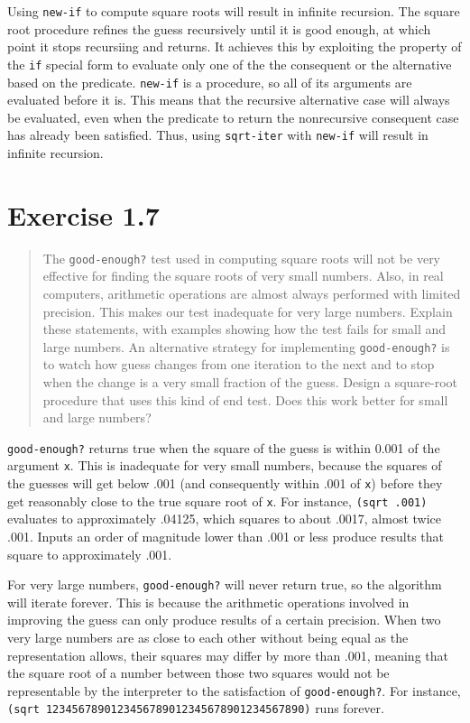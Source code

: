 \documentclass{article}
\begin{document}
Using \verb|new-if| to compute square roots will result in infinite
recursion. The square root procedure refines the guess recursively until it is
good enough, at which point it stops recursiing and returns. It achieves this
by exploiting the property of the \verb|if| special form to evaluate only
one of the the consequent or the alternative based on the predicate.
\verb|new-if| is a procedure, so all of its arguments are evaluated before
it is. This means that the recursive alternative case will always be evaluated,
even when the predicate to return the nonrecursive consequent case has already
been satisfied. Thus, using \verb|sqrt-iter| with \verb|new-if| will
result in infinite recursion.

\section{Exercise 1.7}
\begin{quote}
    The \verb|good-enough?| test used in computing square roots will not be
    very effective for finding the square roots of very small numbers. Also, in
    real computers, arithmetic operations are almost always performed with
    limited precision. This makes our test inadequate for very large numbers.
    Explain these statements, with examples showing how the test fails for
    small and large numbers. An alternative strategy for implementing
    \verb|good-enough?| is to watch how guess changes from one iteration to the
    next and to stop when the change is a very small fraction of the guess.
    Design a square-root procedure that uses this kind of end test. Does this
    work better for small and large numbers?
\end{quote}

\verb|good-enough?| returns true when the square of the guess is within 0.001
of the argument \verb|x|. This is inadequate for very small numbers, because
the squares of the guesses will get below .001 (and consequently within .001 of
\verb|x|) before they get reasonably close to the true square root of \verb|x|.
For instance, \verb|(sqrt .001)| evaluates to approximately .04125, which
squares to about .0017, almost twice .001. Inputs an order of magnitude lower
than .001 or less produce results that square to approximately .001.

For very large numbers, \verb|good-enough?| will never return true, so the
algorithm will iterate forever. This is because the arithmetic operations
involved in improving the guess can only produce results of a certain
precision. When two very large numbers are as close to each other without being
equal as the representation allows, their squares may differ by more than .001,
meaning that the square root of a number between those two squares would not be
representable by the interpreter to the satisfaction of \verb|good-enough?|. For
instance, \verb|(sqrt 1234567890123456789012345678901234567890)| runs forever.
\end{document}
